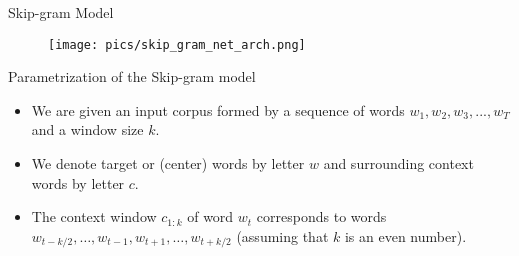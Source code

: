 \documentclass[handout]{beamer}
\begin{document}
\begin{frame}{Skip-gram Model}

  \begin{figure}[h]
        	\texttt{[image: pics/skip\_gram\_net\_arch.png]}
        \end{figure}

\end{frame}








\begin{frame}{Parametrization of the Skip-gram model}
\begin{scriptsize}
\begin{itemize}

\item  We are given an input corpus formed by a sequence of  words $w_1, w_2, w_3, . . . , w_T$ and a window size $k$.

\item We denote target or (center) words by letter $w$ and surrounding context words by letter $c$.

\item The context window $c_{1:k}$ of word $w_t$ corresponds to words $w_{t-k/2},\dots, w_{t-1}, w_{t+1}, \dots, w_{t+k/2}$ (assuming that $k$ is an even number). 

\end{itemize}
\end{scriptsize}
\end{frame}
\end{document}
